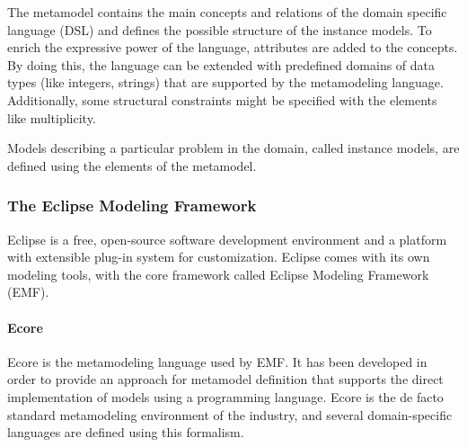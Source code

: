 The metamodel contains the main concepts and relations of the domain specific language (DSL) and defines the possible structure of the instance models. To enrich the expressive power of the language, attributes are added to the concepts. By doing this, the language can be extended with predefined domains of data types (like integers, strings) that are supported by the metamodeling language. Additionally, some structural constraints might be specified with the elements like multiplicity.

Models describing a particular problem in the domain, called instance models, are defined using the elements of the metamodel.

\subsubsection{The Eclipse Modeling Framework}
\label{sect:emf}
Eclipse is a free, open-source software development environment and a platform with extensible plug-in system for customization. Eclipse comes with its own modeling tools, with the core framework called Eclipse Modeling Framework (EMF).


\paragraph{Ecore}
Ecore is the metamodeling language used by EMF. It has been developed in order to provide an approach for metamodel definition that supports the direct implementation of models using a programming language. Ecore is the de facto standard metamodeling environment of the industry, and several domain-specific languages are defined using this formalism.~\cite{scm}

